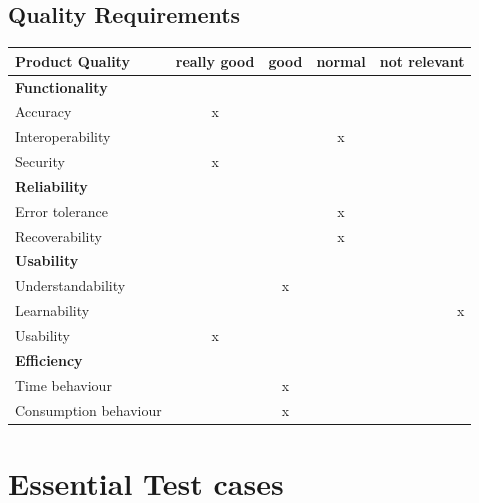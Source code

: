 \documentclass[twoside, english, final]{Pflichtenheft}
\begin{document}
\subsection{Quality Requirements}

\begin{tabular}{l*{3}{c}r}
	Product Quality        & really good & good & normal & not relevant \\
	\hline
	\textbf{Functionality} &             &      &        &              \\
	Accuracy               & x           &      &        &              \\
	Interoperability       &             &      & x      &              \\
	Security               & x           &      &        &              \\
	\textbf{Reliability}   &             &      &        &              \\
	Error tolerance        &             &      & x      &              \\
	Recoverability         &             &      & x      &              \\
	\textbf{Usability}     &             &      &        &              \\
	Understandability      &             & x    &        &              \\
	Learnability           &             &      &        & x            \\
	Usability              & x           &      &        &              \\

	\textbf{Efficiency}    &             &      &        &              \\
	Time behaviour         &             & x    &        &              \\
	Consumption behaviour  &             & x    &        &              \\
\end{tabular}

\section{Essential Test cases}
\end{document}
